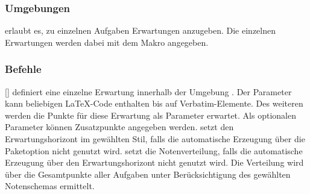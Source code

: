 \subsubsection{Umgebungen}
\begin{environments}
     erlaubt es, zu einzelnen Aufgaben Erwartungen anzugeben. Die einzelnen Erwartungen werden dabei mit dem Makro  angegeben.
\end{environments}

\subsubsection{Befehle}
\begin{commands}
    [] definiert eine einzelne Erwartung innerhalb der Umgebung . Der Parameter kann beliebigen \LaTeX-Code enthalten bis auf Verbatim-Elemente. Des weiteren werden die Punkte für diese Erwartung als Parameter erwartet. Als optionalen Parameter können Zusatzpunkte angegeben werden.
     setzt den Erwartungshorizont im gewählten Stil, falls die automatische Erzeugung über die Paketoption  nicht genutzt wird.
     setzt die Notenverteilung, falls die automatische Erzeugung über den Erwartungshorizont nicht genutzt wird. Die Verteilung wird über die Gesamtpunkte aller Aufgaben unter Berücksichtigung des gewählten Notenschemas ermittelt.
\end{commands}
